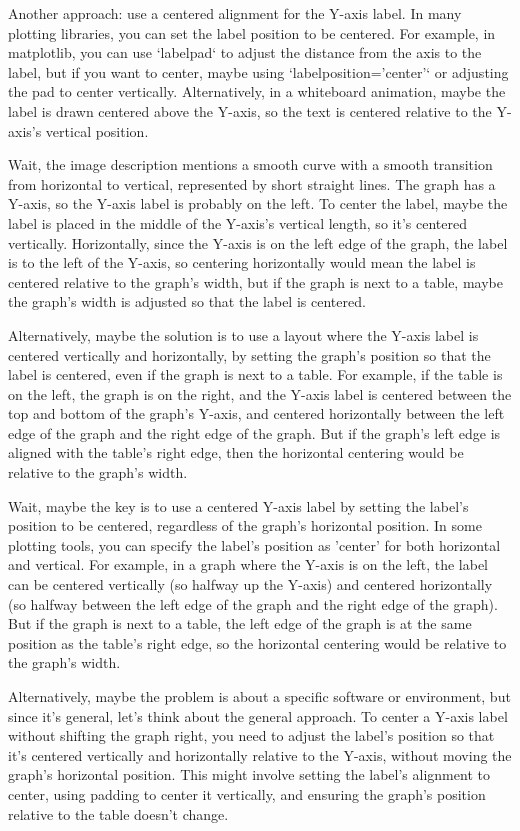 Another approach: use a centered alignment for the Y-axis label. In many plotting libraries, you can set the label position to be centered. For example, in matplotlib, you can use `labelpad` to adjust the distance from the axis to the label, but if you want to center, maybe using `labelposition='center'` or adjusting the pad to center vertically. Alternatively, in a whiteboard animation, maybe the label is drawn centered above the Y-axis, so the text is centered relative to the Y-axis's vertical position.

Wait, the image description mentions a smooth curve with a smooth transition from horizontal to vertical, represented by short straight lines. The graph has a Y-axis, so the Y-axis label is probably on the left. To center the label, maybe the label is placed in the middle of the Y-axis's vertical length, so it's centered vertically. Horizontally, since the Y-axis is on the left edge of the graph, the label is to the left of the Y-axis, so centering horizontally would mean the label is centered relative to the graph's width, but if the graph is next to a table, maybe the graph's width is adjusted so that the label is centered.

Alternatively, maybe the solution is to use a layout where the Y-axis label is centered vertically and horizontally, by setting the graph's position so that the label is centered, even if the graph is next to a table. For example, if the table is on the left, the graph is on the right, and the Y-axis label is centered between the top and bottom of the graph's Y-axis, and centered horizontally between the left edge of the graph and the right edge of the graph. But if the graph's left edge is aligned with the table's right edge, then the horizontal centering would be relative to the graph's width.

Wait, maybe the key is to use a centered Y-axis label by setting the label's position to be centered, regardless of the graph's horizontal position. In some plotting tools, you can specify the label's position as 'center' for both horizontal and vertical. For example, in a graph where the Y-axis is on the left, the label can be centered vertically (so halfway up the Y-axis) and centered horizontally (so halfway between the left edge of the graph and the right edge of the graph). But if the graph is next to a table, the left edge of the graph is at the same position as the table's right edge, so the horizontal centering would be relative to the graph's width.

Alternatively, maybe the problem is about a specific software or environment, but since it's general, let's think about the general approach. To center a Y-axis label without shifting the graph right, you need to adjust the label's position so that it's centered vertically and horizontally relative to the Y-axis, without moving the graph's horizontal position. This might involve setting the label's alignment to center, using padding to center it vertically, and ensuring the graph's position relative to the table doesn't change.

